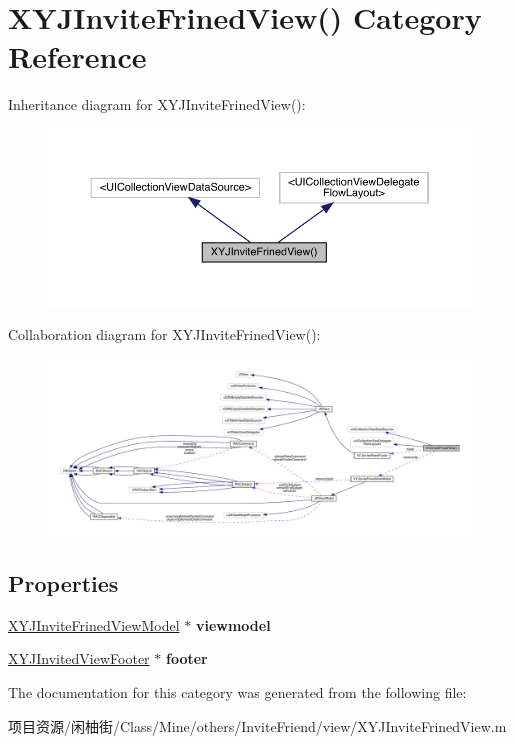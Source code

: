 \hypertarget{category_x_y_j_invite_frined_view_07_08}{}\section{X\+Y\+J\+Invite\+Frined\+View() Category Reference}
\label{category_x_y_j_invite_frined_view_07_08}


Inheritance diagram for X\+Y\+J\+Invite\+Frined\+View()\+:\nopagebreak
\begin{figure}[H]
\begin{center}
\leavevmode
\includegraphics[width=350pt]{category_x_y_j_invite_frined_view_07_08__inherit__graph}
\end{center}
\end{figure}


Collaboration diagram for X\+Y\+J\+Invite\+Frined\+View()\+:\nopagebreak
\begin{figure}[H]
\begin{center}
\leavevmode
\includegraphics[width=350pt]{category_x_y_j_invite_frined_view_07_08__coll__graph}
\end{center}
\end{figure}
\subsection*{Properties}
\begin{DoxyCompactItemize}
\item 
\mbox{\label{category_x_y_j_invite_frined_view_07_08_abb599a5d6d288f3c4d5101524975ab45}} 
\mbox{\hyperlink{interface_x_y_j_invite_frined_view_model}{X\+Y\+J\+Invite\+Frined\+View\+Model}} $\ast$ {\bfseries viewmodel}
\item 
\mbox{\label{category_x_y_j_invite_frined_view_07_08_af21162f0be3793dd69c983c93174c43e}} 
\mbox{\hyperlink{interface_x_y_j_invited_view_footer}{X\+Y\+J\+Invited\+View\+Footer}} $\ast$ {\bfseries footer}
\end{DoxyCompactItemize}


The documentation for this category was generated from the following file\+:\begin{DoxyCompactItemize}
\item 
项目资源/闲柚街/\+Class/\+Mine/others/\+Invite\+Friend/view/X\+Y\+J\+Invite\+Frined\+View.\+m\end{DoxyCompactItemize}
